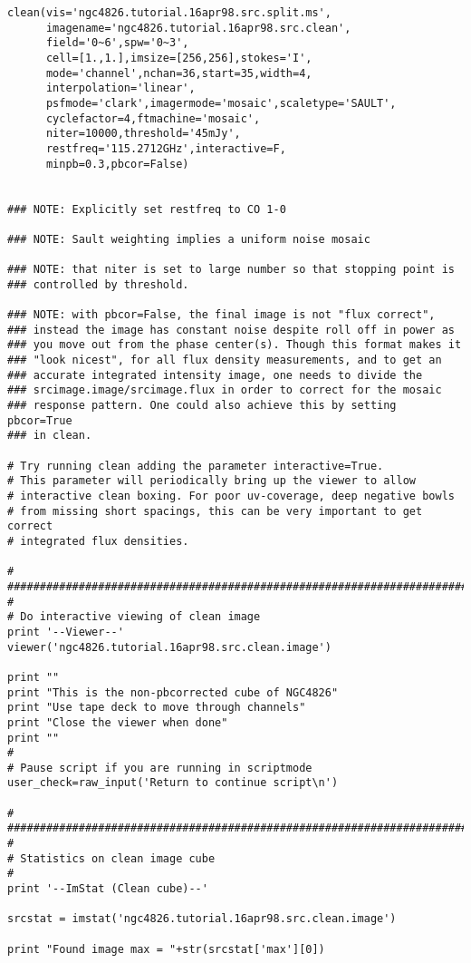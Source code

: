 \begin{verbatim}
clean(vis='ngc4826.tutorial.16apr98.src.split.ms',
      imagename='ngc4826.tutorial.16apr98.src.clean',
      field='0~6',spw='0~3',
      cell=[1.,1.],imsize=[256,256],stokes='I',
      mode='channel',nchan=36,start=35,width=4,
      interpolation='linear',
      psfmode='clark',imagermode='mosaic',scaletype='SAULT',
      cyclefactor=4,ftmachine='mosaic',
      niter=10000,threshold='45mJy',
      restfreq='115.2712GHz',interactive=F,
      minpb=0.3,pbcor=False)


### NOTE: Explicitly set restfreq to CO 1-0

### NOTE: Sault weighting implies a uniform noise mosaic 

### NOTE: that niter is set to large number so that stopping point is
### controlled by threshold.

### NOTE: with pbcor=False, the final image is not "flux correct",
### instead the image has constant noise despite roll off in power as
### you move out from the phase center(s). Though this format makes it
### "look nicest", for all flux density measurements, and to get an
### accurate integrated intensity image, one needs to divide the
### srcimage.image/srcimage.flux in order to correct for the mosaic
### response pattern. One could also achieve this by setting pbcor=True
### in clean.

# Try running clean adding the parameter interactive=True.
# This parameter will periodically bring up the viewer to allow
# interactive clean boxing. For poor uv-coverage, deep negative bowls
# from missing short spacings, this can be very important to get correct
# integrated flux densities.

#
##########################################################################
#
# Do interactive viewing of clean image
print '--Viewer--'
viewer('ngc4826.tutorial.16apr98.src.clean.image')

print ""
print "This is the non-pbcorrected cube of NGC4826"
print "Use tape deck to move through channels"
print "Close the viewer when done"
print ""
#
# Pause script if you are running in scriptmode
user_check=raw_input('Return to continue script\n')

#
##########################################################################
#
# Statistics on clean image cube
#
print '--ImStat (Clean cube)--'

srcstat = imstat('ngc4826.tutorial.16apr98.src.clean.image')

print "Found image max = "+str(srcstat['max'][0])


\end{verbatim}
